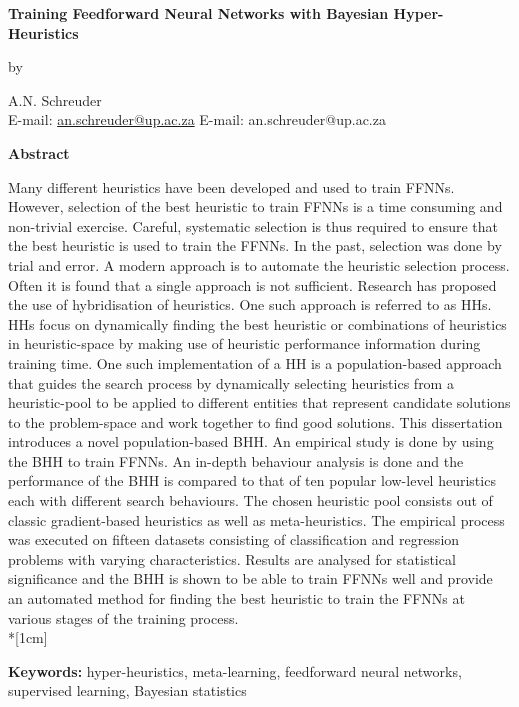 \pagestyle{empty}

\begin{center}
    \Large
    \textbf{Training Feedforward Neural Networks with Bayesian Hyper-Heuristics}
    \vspace{0.5cm}

    \normalsize
    by
    \vspace{0.5cm}

    \normalsize
    A.N. Schreuder\\
    \ifpdf
        E-mail: \href{mailto:an.schreuder@up.ac.za}{an.schreuder@up.ac.za}
    \else
        E-mail: an.schreuder@up.ac.za
    \fi
    \vspace{1cm}

    \Large
    \textbf{Abstract}
\end{center}
\noindent
Many different heuristics have been developed and used to train \acfp{FFNN}.  However, selection of the best heuristic to train
\acsp{FFNN} is a time consuming and non-trivial exercise. Careful, systematic
selection is thus required to ensure that the best heuristic is used to train the \acsp{FFNN}. In the past, selection
was done by trial and error. A modern approach is to automate the heuristic selection
process. Often it is found that a single approach is not sufficient. Research has
proposed the use of hybridisation of heuristics. One such approach is referred to
as \acfp{HH}. \acsp{HH} focus on dynamically finding the best heuristic or combinations of heuristics in
heuristic-space by making use of heuristic performance information during training time. One such
implementation of a \acs{HH} is a population-based approach that guides the search process by
dynamically selecting heuristics from a heuristic-pool to be applied to
different entities that represent candidate solutions to the problem-space and
work together to find good solutions. This dissertation introduces a novel population-based \Acf{BHH}. An empirical study is done by
using the \acs{BHH} to train \acsp{FFNN}. An in-depth behaviour analysis is done and the performance of the \acs{BHH} is compared to that of ten popular low-level heuristics each with different search
behaviours. The chosen heuristic pool consists out of classic gradient-based heuristics as well as meta-heuristics. The empirical process was executed on fifteen datasets consisting of classification and regression problems
with varying characteristics. Results are analysed for statistical significance and the \acs{BHH} is shown to be able to train \acsp{FFNN} well and provide an automated method for finding the best heuristic to train the \acsp{FFNN} at various stages of the training process.\\*[1cm]
\noindent
\parbox{\textwidth}{
    \textbf{Keywords:} hyper-heuristics, meta-learning, feedforward neural
    networks, supervised learning, Bayesian statistics
}
\vfill
\newpage

